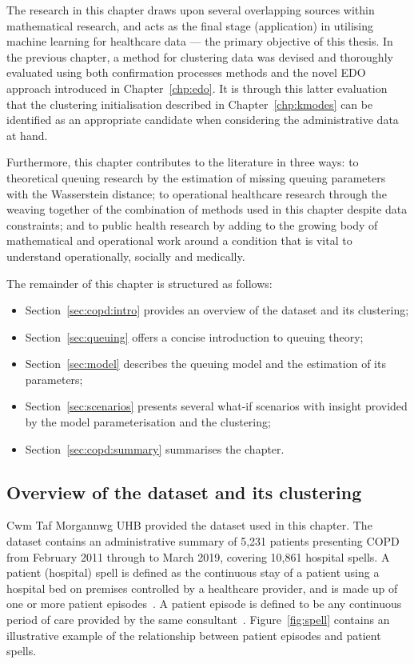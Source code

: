 The research in this chapter draws upon several overlapping sources within
mathematical research, and acts as the final stage (application) in utilising
machine learning for healthcare data --- the primary objective of this thesis.
In the previous chapter, a method for clustering data was devised and thoroughly
evaluated using both confirmation processes methods and the novel EDO approach
introduced in Chapter~\ref{chp:edo}. It is through this latter evaluation that
the clustering initialisation described in Chapter~\ref{chp:kmodes} can be
identified as an appropriate candidate when considering the administrative data
at hand.

Furthermore, this chapter contributes to the literature in three
ways: to theoretical queuing research by the estimation of missing queuing
parameters with the Wasserstein distance; to operational healthcare research
through the weaving together of the combination of methods used in this chapter
despite data constraints; and to public health research by adding to the growing
body of mathematical and operational work around a condition that is vital to
understand operationally, socially and medically.

The remainder of this chapter is structured as follows:

\begin{itemize}
    \item Section~\ref{sec:copd:intro} provides an overview of the dataset and
        its clustering;
    \item Section~\ref{sec:queuing} offers a concise introduction to queuing
        theory;
    \item Section~\ref{sec:model} describes the queuing model and the
        estimation of its parameters;
    \item Section~\ref{sec:scenarios} presents several what-if scenarios with
        insight provided by the model parameterisation and the clustering;
    \item Section~\ref{sec:copd:summary} summarises the chapter.
\end{itemize}


\subsection{Overview of the dataset and its clustering}\label{subsec:overview}

Cwm Taf Morgannwg UHB provided the dataset used in this chapter. The dataset
contains an administrative summary of 5,231 patients presenting COPD from
February 2011 through to March 2019, covering 10,861 hospital spells. A patient
(hospital) spell is defined as the continuous stay of a patient using a hospital
bed on premises controlled by a healthcare provider, and is made up of one or
more patient episodes~\cite{NHS:spell}. A patient episode is defined to be any
continuous period of care provided by the same consultant~\cite{NHS:episode}.
Figure~\ref{fig:spell} contains an illustrative example of the relationship
between patient episodes and patient spells.

